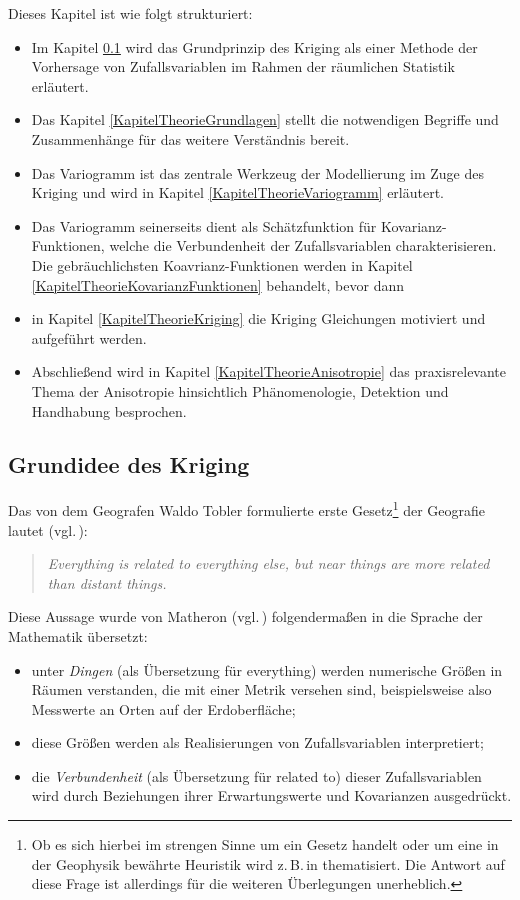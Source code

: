 Dieses Kapitel ist wie folgt strukturiert:
\begin{itemize}[topsep=2pt,parsep=1pt,itemsep=0.5pt]
\item[$\circ$] Im Kapitel \ref{KapitelTheorieKernidee} wird das
Grundprinzip des Kriging als einer Methode der Vorhersage von
Zufallsvariablen im Rahmen der räumlichen Statistik erläutert.
\item[$\circ$] Das Kapitel \ref{KapitelTheorieGrundlagen} stellt 
die notwendigen Begriffe und Zusammenhänge für das weitere Verständnis bereit.
\item[$\circ$] Das Variogramm ist das zentrale Werkzeug der Modellierung
im Zuge des Kriging und wird in Kapitel \ref{KapitelTheorieVariogramm}
erläutert.
\item[$\circ$] Das Variogramm seinerseits dient als
Schätzfunktion für Kovarianz-Funktionen, welche die
Verbundenheit der Zufallsvariablen charakterisieren. Die 
gebräuchlichsten Koavrianz-Funktionen werden in
Kapitel \ref{KapitelTheorieKovarianzFunktionen} behandelt, bevor 
dann  
\item[$\circ$] in Kapitel \ref{KapitelTheorieKriging} 
die Kriging Gleichungen motiviert und aufgeführt werden.  
\item[$\circ$] Abschließend wird in Kapitel \ref{KapitelTheorieAnisotropie} 
das praxisrelevante Thema der Anisotropie hinsichtlich 
Phänomenologie, Detektion und Handhabung besprochen.  
\end{itemize}

\subsection{Grundidee des Kriging}
\label{KapitelTheorieKernidee}
Das von dem Geografen Waldo Tobler formulierte erste 
Gesetz\footnote{Ob es sich hierbei im strengen Sinne um ein Gesetz handelt
oder um eine in der Geophysik bewährte Heuristik wird 
z.\,B.\,in \cite{Miller2004} thematisiert. Die Antwort auf diese Frage ist
allerdings für die weiteren Überlegungen unerheblich.} der Geografie lautet 
(vgl.\,\cite[S.\,236]{Tobler1970}):
\begin{quote}
\glqq \textit{Everything is related to everything else, but near things are more related than distant things.}\grqq
\end{quote}

Diese Aussage wurde von Matheron (vgl.\,\cite{Matheron1971}) folgendermaßen in die Sprache
der Mathematik übersetzt:
\begin{itemize}[topsep=2pt,parsep=1pt,itemsep=0.5pt]
\item[a)] unter \textit{Dingen} (als Übersetzung für \glqq everything\grqq )
werden numerische Größen in Räumen verstanden, die mit einer Metrik 
versehen sind, beispielsweise also Messwerte an Orten auf 
der Erdoberfläche;
\item[b)] diese Größen werden als Realisierungen 
von Zufallsvariablen interpretiert;
\item[c)] die \textit{Verbundenheit} (als Übersetzung für 
\glqq related to\grqq ) dieser Zufallsvariablen wird durch 
Beziehungen ihrer Erwartungswerte und Kovarianzen ausgedrückt.
\end{itemize}

